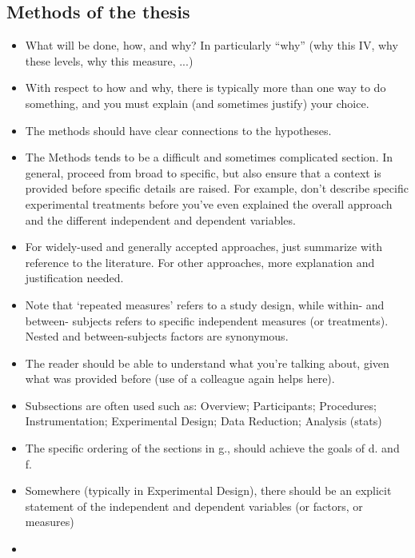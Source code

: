 \subsection*{Methods of the thesis}
\begin{itemize}
  \item What will be done, how, and why? In particularly “why” (why this IV, why these levels, why
  this measure, ...)
  \item With respect to how and why, there is typically more than one way to do something, and you
  must explain (and sometimes justify) your choice.
  \item The methods should have clear connections to the hypotheses.
  \item The Methods tends to be a difficult and sometimes complicated section. In general, proceed
  from broad to specific, but also ensure that a context is provided before specific details are
  raised. For example, don’t describe specific experimental treatments before you’ve even explained
  the overall approach and the different independent and dependent variables.
  \item For widely-used and generally accepted approaches, just summarize with reference to the
  literature. For other approaches, more explanation and justification needed.
  \item Note that ‘repeated measures’ refers to a study design, while within- and between- subjects
  refers to specific independent measures (or treatments). Nested and between-subjects factors are 
  synonymous.
  \item The reader should be able to understand what you’re talking about, given what was provided
  before (use of a colleague again helps here).
  \item Subsections are often used such as: Overview; Participants; Procedures; Instrumentation;
  Experimental Design; Data Reduction; Analysis (stats)
  \item The specific ordering of the sections in g., should achieve the goals of d. and f.
  \item Somewhere (typically in Experimental Design), there should be an explicit statement of the
  independent and dependent variables (or factors, or measures)
  \item 
\end{itemize}

